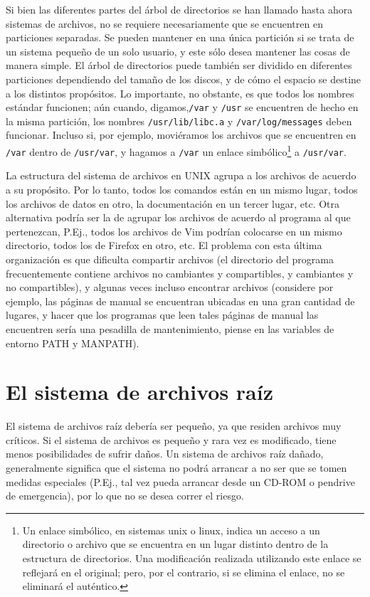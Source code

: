 \documentclass[12pt]{article}
\begin{document}
Si bien las diferentes partes del árbol de directorios se han
llamado hasta ahora sistemas de archivos, no se requiere necesariamente que se
encuentren en particiones separadas. Se pueden mantener en una única
partición si se trata de un sistema pequeño de un solo usuario, y este sólo
desea mantener las cosas de manera simple. El árbol de directorios puede también
ser dividido en  diferentes particiones dependiendo del tamaño de los discos, y
de cómo el espacio se destine a los distintos propósitos. Lo importante, no
obstante, es que todos los nombres estándar funcionen; aún cuando,
digamos,\texttt{/var} y \texttt{/usr} se encuentren de
hecho en la misma partición, los nombres \texttt{/usr/lib/libc.a} y
\texttt{/var/log/messages} deben funcionar. Incluso si, por ejemplo,
moviéramos los archivos que se encuentren en \texttt{/var} dentro de
\texttt{/usr/var}, y hagamos a \texttt{/var} un enlace
simbólico\footnote{Un enlace simbólico, en sistemas unix o linux, indica 
un acceso a un directorio o archivo que se encuentra en un lugar distinto
dentro de la estructura de directorios. Una modificación realizada 
utilizando este enlace se reflejará en el original; pero, por el contrario, 
si se elimina el enlace, no se eliminará el auténtico.} a \texttt{/usr/var}.

 La estructura del sistema de archivos en UNIX agrupa a los archivos de
acuerdo a su propósito. Por lo tanto, todos los comandos están en un mismo
lugar, todos los archivos de datos en otro, la documentación en un tercer lugar,
etc.  Otra alternativa podría ser la de agrupar los archivos de acuerdo al
programa al que pertenezcan, P.Ej., todos los archivos de Vim podrían
colocarse en un mismo directorio, todos los de Firefox en otro, etc. El problema con
esta última organización es que dificulta compartir archivos (el directorio del
programa frecuentemente contiene archivos no cambiantes y compartibles, y
cambiantes y no compartibles), y algunas veces incluso encontrar archivos (considere 
por ejemplo, las páginas de manual se encuentran ubicadas en una gran cantidad de
lugares, y hacer que los programas que leen tales páginas de manual las
encuentren sería una pesadilla de mantenimiento, piense en las variables de entorno
PATH y MANPATH).  


\section{ El sistema de archivos raíz}

 El sistema de archivos raíz debería ser pequeño, ya que residen archivos
muy críticos. Si el sistema de archivos es pequeño y rara vez es modificado,
tiene menos posibilidades de sufrir daños. Un sistema de archivos raíz dañado,
generalmente significa que el sistema no podrá arrancar a no ser que se tomen
medidas especiales (P.Ej., tal vez pueda arrancar desde un CD-ROM o pendrive de
emergencia), por lo que no se desea correr el riesgo.  
\end{document}
